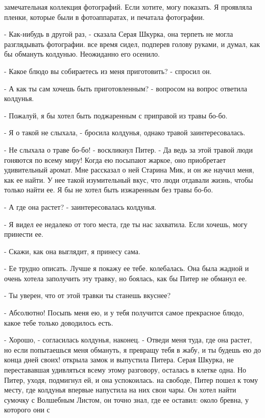 замечательная коллекция фотографий. Если хотите, могу показать. Я 
проявляла пленки, которые были в фотоаппаратах, и печатала фотографии.
\par- Как-нибудь в другой раз, - сказала Серая Шкурка, она терпеть не 
могла разглядывать фотографии.
 все время сидел, подперев голову руками, и думал, как бы 
обмануть колдунью. Неожиданно его осенило.
\par- Какое блюдо вы собираетесь из меня приготовить? - спросил он.
\par- А как ты сам хочешь быть приготовленным? - вопросом на вопрос 
ответила колдунья.
\par- Пожалуй, я бы хотел быть поджаренным с приправой из травы бо-бо.
\par- Я о такой не слыхала, - бросила колдунья, однако травой 
заинтересовалась.
\par- Не слыхала о траве бо-бо! - воскликнул Питер. - Да ведь за этой 
травой люди гоняются по всему миру! Когда ею посыпают жаркое, оно 
приобретает удивительный аромат. Мне рассказал о ней Старина Мик, и он 
же научил меня, как ее найти. У нее такой изумительный вкус, что люди 
отдавали жизнь, чтобы только найти ее. Я бы не хотел быть изжаренным 
без травы бо-бо.
\par- А где она растет? - заинтересовалась колдунья.
\par- Я видел ее недалеко от того места, где ты нас захватила. Если 
хочешь, могу принести ее.
\par- Скажи, как она выглядит, я принесу сама.
\par- Ее трудно описать. Лучше я покажу ее тебе.
 колебалась. Она была жадной и очень хотела заполучить эту 
травку, но боялась, как бы Питер не обманул ее.
\par- Ты уверен, что от этой травки ты станешь вкуснее?
\par- Абсолютно! Посыпь меня ею, и у тебя получится самое прекрасное 
блюдо, какое тебе только доводилось есть.
\par- Хорошо, - согласилась колдунья, наконец. - Отведи меня туда, где 
она растет, но если попытаешься меня обмануть, я превращу тебя в жабу, 
и ты будешь ею до конца дней своих!
 открыла замок и выпустила Питера. Серая Шкурка, не 
перестававшая удивляться всему этому разговору, осталась в клетке 
одна. Но Питер, уходя, подмигнул ей, и она успокоилась.
 на свободе, Питер пошел к тому месту, где колдунья 
впервые напустила на них свои чары. Он хотел найти сумочку с Волшебным 
Листом, он точно знал, где ее оставил: около бревна, у которого они с 
